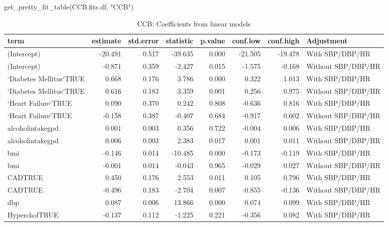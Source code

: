 \documentclass[
]{article}
\newenvironment{Shaded}{\begin{snugshade}}{\end{snugshade}}
\newcommand{\FunctionTok}[1]{\textcolor[rgb]{0.00,0.00,0.00}{#1}}
\newcommand{\NormalTok}[1]{#1}
\newcommand{\StringTok}[1]{\textcolor[rgb]{0.31,0.60,0.02}{#1}}
\begin{document}
\begin{Shaded}
\begin{Highlighting}[]
\FunctionTok{get\_pretty\_fit\_table}\NormalTok{(CCB.fits.df, }\StringTok{"CCB"}\NormalTok{)}
\end{Highlighting}
\end{Shaded}

\begin{table}

\caption{\label{tab:CCB-fit-table}CCB: Coefficients from linear models}
\centering
\begin{tabular}[t]{l|r|r|r|r|r|r|l}
\hline
term & estimate & std.error & statistic & p.value & conf.low & conf.high & Adjustment\\
\hline
(Intercept) & -20.491 & 0.517 & -39.635 & 0.000 & -21.505 & -19.478 & With SBP/DBP/HR\\
\hline
(Intercept) & -0.871 & 0.359 & -2.427 & 0.015 & -1.575 & -0.168 & Without SBP/DBP/HR\\
\hline
`Diabetes Mellitus`TRUE & 0.668 & 0.176 & 3.786 & 0.000 & 0.322 & 1.013 & With SBP/DBP/HR\\
\hline
`Diabetes Mellitus`TRUE & 0.616 & 0.183 & 3.359 & 0.001 & 0.256 & 0.975 & Without SBP/DBP/HR\\
\hline
`Heart Failure`TRUE & 0.090 & 0.370 & 0.242 & 0.808 & -0.636 & 0.816 & With SBP/DBP/HR\\
\hline
`Heart Failure`TRUE & -0.158 & 0.387 & -0.407 & 0.684 & -0.917 & 0.602 & Without SBP/DBP/HR\\
\hline
alcoholintakegpd & 0.001 & 0.003 & 0.356 & 0.722 & -0.004 & 0.006 & With SBP/DBP/HR\\
\hline
alcoholintakegpd & 0.006 & 0.003 & 2.383 & 0.017 & 0.001 & 0.011 & Without SBP/DBP/HR\\
\hline
bmi & -0.146 & 0.014 & -10.485 & 0.000 & -0.173 & -0.119 & With SBP/DBP/HR\\
\hline
bmi & -0.001 & 0.014 & -0.043 & 0.965 & -0.029 & 0.027 & Without SBP/DBP/HR\\
\hline
CADTRUE & 0.450 & 0.176 & 2.553 & 0.011 & 0.105 & 0.796 & With SBP/DBP/HR\\
\hline
CADTRUE & -0.496 & 0.183 & -2.704 & 0.007 & -0.855 & -0.136 & Without SBP/DBP/HR\\
\hline
dbp & 0.087 & 0.006 & 13.866 & 0.000 & 0.074 & 0.099 & With SBP/DBP/HR\\
\hline
HypercholTRUE & -0.137 & 0.112 & -1.225 & 0.221 & -0.356 & 0.082 & With SBP/DBP/HR\\

\end{tabular}
\end{table}
\end{document}
